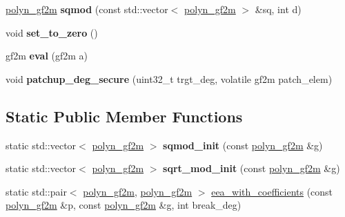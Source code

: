 \begin{DoxyCompactItemize}
\mbox{\label{class_botan_1_1polyn__gf2m_ae1b6070fc4853e44bcf74a99a686c472}} 
\mbox{\hyperlink{class_botan_1_1polyn__gf2m}{polyn\+\_\+gf2m}} {\bfseries sqmod} (const std\+::vector$<$ \mbox{\hyperlink{class_botan_1_1polyn__gf2m}{polyn\+\_\+gf2m}} $>$ \&sq, int d)
\item 
\mbox{\label{class_botan_1_1polyn__gf2m_a097fb29709eb8794316ccd9afa879c46}} 
void {\bfseries set\+\_\+to\+\_\+zero} ()
\item 
\mbox{\label{class_botan_1_1polyn__gf2m_ae25fb2bcf872e48c4d4bca144663e0a7}} 
gf2m {\bfseries eval} (gf2m a)
\item 
\mbox{\label{class_botan_1_1polyn__gf2m_ac555338c1424697df82bc147872b4f82}} 
void {\bfseries patchup\+\_\+deg\+\_\+secure} (uint32\+\_\+t trgt\+\_\+deg, volatile gf2m patch\+\_\+elem)
\end{DoxyCompactItemize}
\subsection*{Static Public Member Functions}
\begin{DoxyCompactItemize}
\item 
\mbox{\label{class_botan_1_1polyn__gf2m_a85d8471937bb288db94ca5159835b2f2}} 
static std\+::vector$<$ \mbox{\hyperlink{class_botan_1_1polyn__gf2m}{polyn\+\_\+gf2m}} $>$ {\bfseries sqmod\+\_\+init} (const \mbox{\hyperlink{class_botan_1_1polyn__gf2m}{polyn\+\_\+gf2m}} \&g)
\item 
\mbox{\label{class_botan_1_1polyn__gf2m_a9badfc4d1b2699248349747edb30c786}} 
static std\+::vector$<$ \mbox{\hyperlink{class_botan_1_1polyn__gf2m}{polyn\+\_\+gf2m}} $>$ {\bfseries sqrt\+\_\+mod\+\_\+init} (const \mbox{\hyperlink{class_botan_1_1polyn__gf2m}{polyn\+\_\+gf2m}} \&g)
\item 
static std\+::pair$<$ \mbox{\hyperlink{class_botan_1_1polyn__gf2m}{polyn\+\_\+gf2m}}, \mbox{\hyperlink{class_botan_1_1polyn__gf2m}{polyn\+\_\+gf2m}} $>$ \mbox{\hyperlink{class_botan_1_1polyn__gf2m_a34abf02cef12e433c78046c758b4efe6}{eea\+\_\+with\+\_\+coefficients}} (const \mbox{\hyperlink{class_botan_1_1polyn__gf2m}{polyn\+\_\+gf2m}} \&p, const \mbox{\hyperlink{class_botan_1_1polyn__gf2m}{polyn\+\_\+gf2m}} \&g, int break\+\_\+deg)
\end{DoxyCompactItemize}
